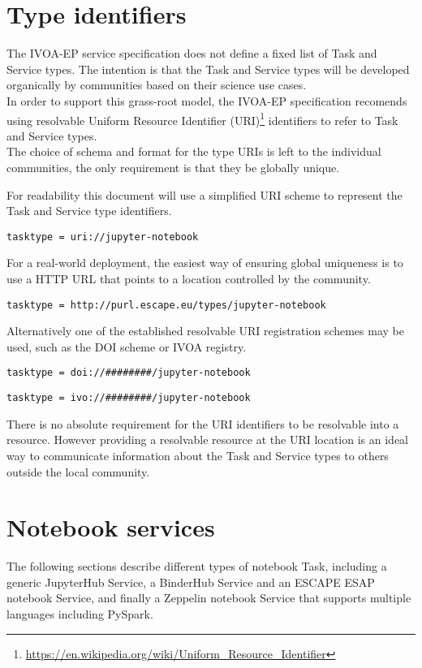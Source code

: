 \documentclass[11pt,a4paper]{ivoa}
\newcommand{\ivoep} {IVOA-EP\xspace}
\newcommand{\binderhub} {BinderHub\xspace}
\newcommand{\jupyterhub} {JupyterHub\xspace}
\newcommand{\esap} {ESAP\xspace}
\newcommand{\escape} {ESCAPE\xspace}
\newcommand{\pyspark} {PySpark\xspace}
\newcommand{\zeppelin} {Zeppelin\xspace}
\newcommand{\footurl}[1] {\footnote{\url{#1}}}
\begin{document}
\section{Type identifiers}
\label{sec:type-identifiers}
The \ivoep service specification does not define a fixed list of Task and Service types.
The intention is that the Task and Service types will be developed organically by communities based on their science use cases.
\\
In order to support this grass-root model, the \ivoep specification recomends using resolvable Uniform Resource Identifier (URI)\footurl{https://en.wikipedia.org/wiki/Uniform_Resource_Identifier} identifiers to refer to Task and Service types.
\\
The choice of schema and format for the type URIs is left to the individual communities, the only requirement is that they be globally unique.

For readability this document will use a simplified URI scheme to represent the Task and Service type identifiers.
\begin{lstlisting}[]
    tasktype = uri://jupyter-notebook
\end{lstlisting}

For a real-world deployment, the easiest way of ensuring global uniqueness is to use a HTTP URL that points to a location controlled by the community.
\begin{lstlisting}[]
    tasktype = http://purl.escape.eu/types/jupyter-notebook
\end{lstlisting}
Alternatively one of the established resolvable URI registration schemes may be used, such as the DOI scheme or IVOA registry.
\begin{lstlisting}[]
    tasktype = doi://########/jupyter-notebook
\end{lstlisting}
\begin{lstlisting}[]
    tasktype = ivo://########/jupyter-notebook
\end{lstlisting}

There is no absolute requirement for the URI identifiers to be resolvable into a resource.
However providing a resolvable resource at the URI location is an ideal way to communicate information about the Task and Service types to others outside the local community.

\section{Notebook services}
\label{sec:notebook-services}
The following sections describe different types of notebook Task, including a generic \jupyterhub Service, a \binderhub Service and an \escape \esap notebook Service, and finally a \zeppelin notebook Service that supports multiple languages including \pyspark.
\end{document}
